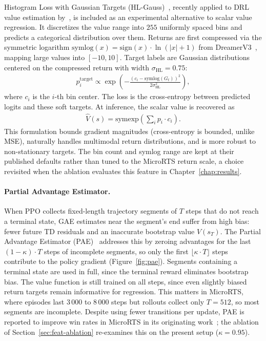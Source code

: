 Histogram Loss with Gaussian Targets (HL-Gauss)~\cite{imaniImprovingRegressionDistributional2018}, recently applied to DRL value estimation by~\cite{farebrother2024StopRegressing}, is included as an experimental alternative to scalar value regression. It discretizes the value range into $255$ uniformly spaced bins and predicts a categorical distribution over them. Returns are first compressed via the symmetric logarithm $\text{symlog}(x) = \text{sign}(x) \cdot \ln(|x|+1)$ from DreamerV3~\cite{hafnerMasteringDiverseDomains2023}, mapping large values into $[-10, 10]$. Target labels are Gaussian distributions centered on the compressed return with width $\sigma_{\text{HL}} = 0.75$:
\begin{align}
p_i^{\text{target}} \propto \exp\!\left(-\frac{(c_i - \text{symlog}(G_t))^2}{2\sigma_{\text{HL}}^2}\right),
\end{align}
where $c_i$ is the $i$-th bin center. The loss is the cross-entropy between predicted logits and these soft targets. At inference, the scalar value is recovered as
\begin{align}
\hat{V}(s) = \text{symexp}\!\left(\sum_i p_i \cdot c_i\right).
\end{align}
This formulation bounds gradient magnitudes (cross-entropy is bounded, unlike MSE), naturally handles multimodal return distributions, and is more robust to non-stationary targets. The bin count and symlog range are kept at their published defaults rather than tuned to the MicroRTS return scale, a choice revisited when the ablation evaluates this feature in Chapter~\ref{chap:results}.

\paragraph{Partial Advantage Estimator.}

When PPO collects fixed-length trajectory segments of $T$ steps that do not reach a terminal state, GAE estimates near the segment's end suffer from high bias: fewer future TD residuals and an inaccurate bootstrap value $V(s_T)$. The Partial Advantage Estimator (PAE)~\cite{jinPartialAdvantageEstimator2025} addresses this by zeroing advantages for the last $(1{-}\kappa) \cdot T$ steps of incomplete segments, so only the first $\lfloor \kappa \cdot T \rfloor$ steps contribute to the policy gradient (Figure~\ref{fig:pae}). Segments containing a terminal state are used in full, since the terminal reward eliminates bootstrap bias. The value function is still trained on all steps, since even slightly biased return targets remain informative for regression. This matters in MicroRTS, where episodes last $3\,000$ to $8\,000$ steps but rollouts collect only $T = 512$, so most segments are incomplete. Despite using fewer transitions per update, PAE is reported to improve win rates in MicroRTS in its originating work~\cite{jinPartialAdvantageEstimator2025}; the ablation of Section~\ref{sec:feat-ablation} re-examines this on the present setup ($\kappa = 0.95$).


